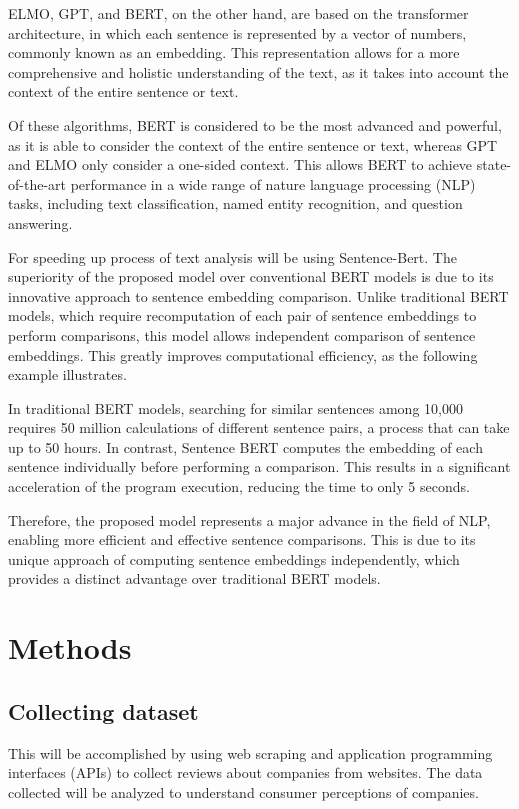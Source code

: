 \documentclass[PI]{ProjectProposal}
\begin{document}
ELMO, GPT, and BERT, on the other hand, are based on the transformer architecture, in which each sentence is represented by a vector of numbers, commonly known as an embedding. This representation allows for a more comprehensive and holistic understanding of the text, as it takes into account the context of the entire sentence or text.

Of these algorithms, BERT is considered to be the most advanced and powerful\autocite{devlin2018bert}, as it is able to consider the context of the entire sentence or text, whereas GPT and ELMO only consider a one-sided context. This allows BERT to achieve state-of-the-art performance in a wide range of nature language processing (NLP) tasks, including text classification, named entity recognition, and question answering.

For speeding up process of text analysis will be using Sentence-Bert\autocite{reimers-2019-sentence-bert}. The superiority of the proposed model over conventional BERT models is due to its innovative approach to sentence embedding comparison. Unlike traditional BERT models, which require recomputation of each pair of sentence embeddings to perform comparisons, this model allows independent comparison of sentence embeddings. This greatly improves computational efficiency, as the following example illustrates.

In traditional BERT models, searching for similar sentences among 10,000 requires 50 million calculations of different sentence pairs, a process that can take up to 50 hours. In contrast, Sentence BERT computes the embedding of each sentence individually before performing a comparison. This results in a significant acceleration of the program execution, reducing the time to only 5 seconds.

Therefore, the proposed model represents a major advance in the field of NLP, enabling more efficient and effective sentence comparisons. This is due to its unique approach of computing sentence embeddings independently, which provides a distinct advantage over traditional BERT models.
\section{Methods}
\label{sec:org1c21007}
\subsection{Collecting dataset}
\label{sec:org26cce3d}
This will be accomplished by using web scraping and application programming interfaces (APIs) to collect reviews about companies from websites. The data collected will be analyzed to understand consumer perceptions of companies.
\end{document}
